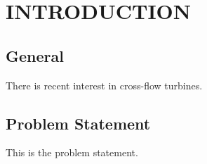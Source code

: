 \chapter{INTRODUCTION}              %
\section{General}
\par \indent

There is recent interest in cross-flow turbines.

\section{Problem Statement}
\par \indent
This is the problem statement.